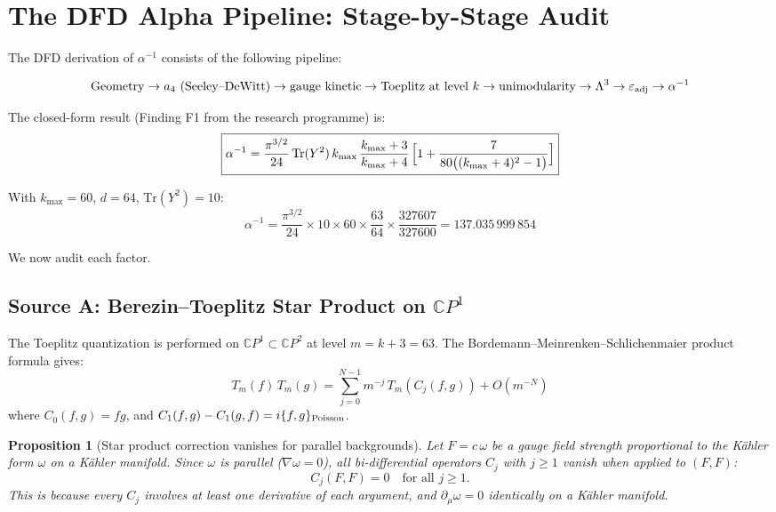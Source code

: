 \documentclass[12pt,a4paper]{article}
\newtheorem{proposition}{Proposition}
\theoremstyle{definition}
\theoremstyle{remark}
\newcommand{\CP}{\mathbb{C}P}
\newcommand{\Tr}{\mathrm{Tr}}
\newcommand{\inv}{^{-1}}
\begin{document}
\section{The DFD Alpha Pipeline: Stage-by-Stage Audit}
\label{sec:pipeline}

The DFD derivation of $\alpha\inv$ consists of the following pipeline:

\begin{equation}
\text{Geometry} \to a_4 \text{ (Seeley--DeWitt)} \to
\text{gauge kinetic} \to
\text{Toeplitz at level } k \to
\text{unimodularity} \to
\Lambda^3 \to
\varepsilon_{\rm adj} \to \alpha\inv
\end{equation}

The closed-form result (Finding F1 from the research programme) is:
\begin{equation}
\label{eq:F1}
\boxed{
\alpha\inv = \frac{\pi^{3/2}}{24}\,\Tr(Y^2)\,k_{\max}\,
\frac{k_{\max}+3}{k_{\max}+4}\,
\Bigl[1 + \frac{7}{80\bigl((k_{\max}+4)^2 - 1\bigr)}\Bigr]
}
\end{equation}

With $k_{\max} = 60$, $d = 64$, $\Tr(Y^2) = 10$:
\begin{equation}
\alpha\inv = \frac{\pi^{3/2}}{24} \times 10 \times 60 \times \frac{63}{64}
\times \frac{327607}{327600} = 137.035\,999\,854
\end{equation}

We now audit each factor.

\subsection{Source A: Berezin--Toeplitz Star Product on $\CP^1$}
\label{sec:sourceA}

The Toeplitz quantization is performed on $\CP^1 \subset \CP^2$ at level
$m = k + 3 = 63$. The Bordemann--Meinrenken--Schlichenmaier product formula
gives:
\begin{equation}
T_m(f)\,T_m(g) = \sum_{j=0}^{N-1} m^{-j}\,T_m(C_j(f,g)) + O(m^{-N})
\end{equation}
where $C_0(f,g) = fg$, and $C_1(f,g) - C_1(g,f) = i\{f,g\}_{\rm Poisson}$.

\begin{proposition}[Star product correction vanishes for parallel backgrounds]
\label{prop:parallel}
Let $F = c\,\omega$ be a gauge field strength proportional to the K\"ahler form
$\omega$ on a K\"ahler manifold. Since $\omega$ is parallel ($\nabla\omega = 0$),
all bi-differential operators $C_j$ with $j \geq 1$ vanish when applied to
$(F, F)$:
\begin{equation}
C_j(F, F) = 0 \quad \text{for all } j \geq 1.
\end{equation}
This is because every $C_j$ involves at least one derivative of each argument,
and $\partial_\mu \omega = 0$ identically on a K\"ahler manifold.
\end{proposition}
\end{document}
